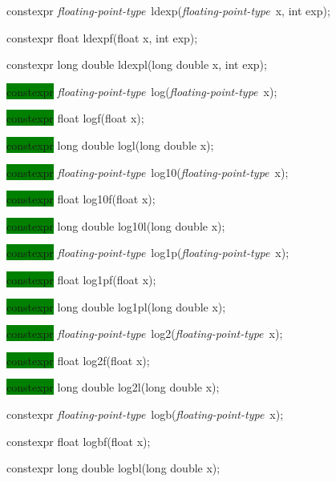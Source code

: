 \documentclass[prd,twocolumn,amsmath,amssymb,nofootinbib,eqsecnum]{revtex4-1}
\newcommand{\highlight}[1]{\colorbox{green}{\!\!\!\! #1}}
\newcommand{\oldhighlight}[1]{#1}
\newcommand{\fptype}{{\it floating-point-type}}
\begin{document}
{%

\oldhighlight{constexpr} \fptype\ ldexp(\fptype\ x, int exp);

\oldhighlight{constexpr} float ldexpf(float x, int exp);

\oldhighlight{constexpr} long double ldexpl(long double x, int exp);

\vspace{2ex}


\highlight{constexpr} \fptype\  log(\fptype\ x);

\highlight{constexpr} float logf(float x);

\highlight{constexpr} long double logl(long double x);

\vspace{2ex}


\highlight{constexpr} \fptype\  log10(\fptype\ x);

\highlight{constexpr} float log10f(float x);

\highlight{constexpr} long double log10l(long double x);

\vspace{2ex}


\highlight{constexpr} \fptype\ log1p(\fptype\ x);

\highlight{constexpr} float log1pf(float x);

\highlight{constexpr} long double log1pl(long double x);

\vspace{2ex}


\highlight{constexpr} \fptype\ log2(\fptype\ x);

\highlight{constexpr} float log2f(float x);

\highlight{constexpr} long double log2l(long double x);

\vspace{2ex}


\oldhighlight{constexpr} \fptype\ logb(\fptype\ x);

\oldhighlight{constexpr} float logbf(float x);

\oldhighlight{constexpr} long double logbl(long double x);

\vspace{2ex}


}
\end{document}
